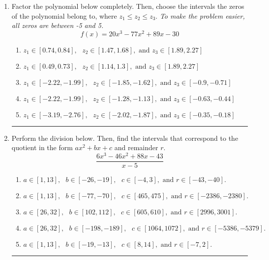 \documentclass[14pt]{extbook}
\newcommand{\litem}[1]{\item#1\hspace*{-1cm}\rule{\textwidth}{0.4pt}}
\begin{document}
\begin{enumerate}
{\begin{enumerate}[label=\Alph*.]
\end{enumerate} }
\litem{
Factor the polynomial below completely. Then, choose the intervals the zeros of the polynomial belong to, where $z_1 \leq z_2 \leq z_3$. \textit{To make the problem easier, all zeros are between -5 and 5.}\[ f(x) = 20x^{3} -77 x^{2} +89 x -30 \]\begin{enumerate}[label=\Alph*.]
\item \( z_1 \in [0.74, 0.84], \text{   }  z_2 \in [1.47, 1.68], \text{   and   } z_3 \in [1.89, 2.27] \)
\item \( z_1 \in [0.49, 0.73], \text{   }  z_2 \in [1.14, 1.3], \text{   and   } z_3 \in [1.89, 2.27] \)
\item \( z_1 \in [-2.22, -1.99], \text{   }  z_2 \in [-1.85, -1.62], \text{   and   } z_3 \in [-0.9, -0.71] \)
\item \( z_1 \in [-2.22, -1.99], \text{   }  z_2 \in [-1.28, -1.13], \text{   and   } z_3 \in [-0.63, -0.44] \)
\item \( z_1 \in [-3.19, -2.76], \text{   }  z_2 \in [-2.02, -1.87], \text{   and   } z_3 \in [-0.35, -0.18] \)

\end{enumerate} }
\litem{
Perform the division below. Then, find the intervals that correspond to the quotient in the form $ax^2+bx+c$ and remainder $r$.\[ \frac{6x^{3} -46 x^{2} +88 x -43}{x -5} \]\begin{enumerate}[label=\Alph*.]
\item \( a \in [1, 13], \text{   } b \in [-26, -19], \text{   } c \in [-4, 3], \text{   and   } r \in [-43, -40]. \)
\item \( a \in [1, 13], \text{   } b \in [-77, -70], \text{   } c \in [465, 475], \text{   and   } r \in [-2386, -2380]. \)
\item \( a \in [26, 32], \text{   } b \in [102, 112], \text{   } c \in [605, 610], \text{   and   } r \in [2996, 3001]. \)
\item \( a \in [26, 32], \text{   } b \in [-198, -189], \text{   } c \in [1064, 1072], \text{   and   } r \in [-5386, -5379]. \)
\item \( a \in [1, 13], \text{   } b \in [-19, -13], \text{   } c \in [8, 14], \text{   and   } r \in [-7, 2]. \)


\end{enumerate}}
\end{enumerate}
\end{document}

